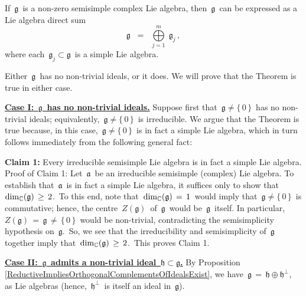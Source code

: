 
\vskip 0.5cm
\begin{theorem}
\label{SemisimpleImpliesDirectSumOfSimples}
\mbox{}
\vskip 0.1cm
\noindent
If \,$\mathfrak{g}$\, is a non-zero semisimple complex Lie algebra,
then \,$\mathfrak{g}$\, can be expressed as a Lie algebra direct sum
\begin{equation*}
\mathfrak{g}
\;\; = \;\;
    \overset{m}{\underset{j = 1}{\bigoplus}}\;\mathfrak{g}_{j}\,,
\end{equation*}
where each \,$\mathfrak{g}_{j} \subset \mathfrak{g}$\, is a simple Lie algebra.
\end{theorem}
\proof
Either \,$\mathfrak{g}$\, has no non-trivial ideals, or it does.
We will prove that the Theorem is true in either case.

\vskip 0.5cm
\noindent
\underline{\textbf{Case I: \,$\mathfrak{g}$\, has no non-trivial ideals.}}
\vskip 0.2cm
\noindent
Suppose first that \,$\mathfrak{g} \neq \{\,0\,\}$\, has no non-trivial ideals;
equivalently, \,$\mathfrak{g} \neq \{\,0\,\}$\, is irreducible.
We argue that the Theorem is true because, in this case,
\,$\mathfrak{g} \neq \{\,0\,\}$\, is in fact a simple Lie algebra,
which in turn follows immediately from the following general fact:

\vskip 0.3cm
\noindent
\textbf{Claim 1:}\;\;
Every irreducible semisimple Lie algebra is in fact a simple Lie algebra.
\vskip 0.05cm
\noindent
Proof of Claim 1:\;\;
Let \,$\mathfrak{a}$\, be an irreducible semisimple (complex) Lie algebra.
To establish that \,$\mathfrak{a}$\, is in fact a simple Lie algebra,
it suffices only to show that \,$\dim_{\mathbb{C}}(\mathfrak{g}) \,\geq\, 2$.\,
To this end, note that \,$\dim_{\mathbb{C}}(\mathfrak{g}) \,=\, 1$\, would imply that
\,$\mathfrak{g} \neq \{\,0\,\}$\,
is commutative; hence, the centre \,$Z(\mathfrak{g})$\,
of \,$\mathfrak{g}$\, would be \,$\mathfrak{g}$\, itself.
In particular,
\,$Z(\mathfrak{g}) \,=\, \mathfrak{g} \,\neq\, \{\,0\,\}$\,
would be non-trivial, contradicting the semisimplicity hypothesis on \,$\mathfrak{g}$.\,
So, we see that the irreducibility and semisimplicity of \,$\mathfrak{g}$\, together
imply that \,$\dim_{\mathbb{C}}(\mathfrak{g}) \,\geq\, 2$.\,
This proves Claim 1.

\vskip 0.5cm
\noindent
\underline{\textbf{Case II: \,$\mathfrak{g}$\, admits a non-trivial ideal \,$\mathfrak{h} \subset \mathfrak{g}$.}}
\vskip 0.2cm
\noindent
By Proposition \ref{ReductiveImpliesOrthogonalComplementsOfIdealsExist},
we have
\,$\mathfrak{g} \,=\, \mathfrak{h} \oplus \mathfrak{h}^{\perp}$,\,
as Lie algebras (hence, \,$\mathfrak{h}^{\perp}$\, is itself an ideal in \,$\mathfrak{g}$).

